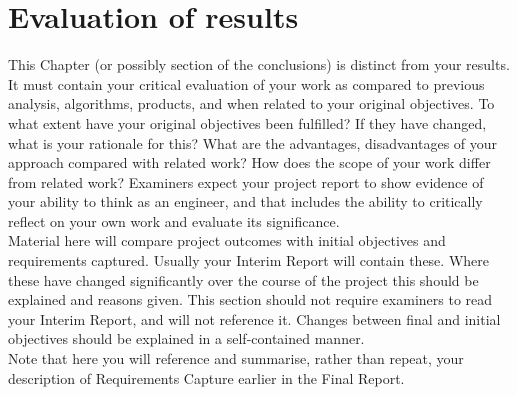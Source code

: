 \section{Evaluation of results}
This Chapter (or possibly section of the conclusions) is
distinct from your results. It must contain your critical
evaluation of your work as compared to previous
analysis, algorithms, products, and when related to
your original objectives. To what extent have your
original objectives been fulfilled? If they have
changed, what is your rationale for this? What are the
advantages, disadvantages of your approach
compared with related work? How does the scope of
your work differ from related work? Examiners expect
your project report to show evidence of your ability to
think as an engineer, and that includes the ability to
critically reflect on your own work and evaluate its
significance.\\ \newline \noindent Material here will compare project outcomes with
initial objectives and requirements captured. Usually
your Interim Report will contain these. Where these
have changed significantly over the course of the
project this should be explained and reasons given.
This section should not require examiners to read
your Interim Report, and will not reference it. Changes
between final and initial objectives should be
explained in a self-contained manner.\\ \newline \noindent Note that here you will reference and summarise,
rather than repeat, your description of Requirements
Capture earlier in the Final Report.


